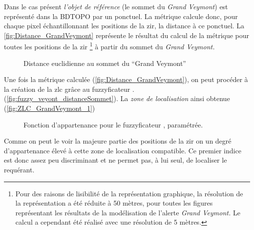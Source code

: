 Dans le cas présent \emph{l'objet de référence} (le sommet du
\emph{Grand Veymont}) est représenté dans la BDTOPO par un
ponctuel. La métrique  calcule donc, pour chaque
pixel échantillonnant les positions de la \ac{zir}, la distance à ce
ponctuel. La \autoref{fig:Distance_GrandVeymont} représente le
résultat du calcul de la métrique  pour toutes
les positions de la \ac{zir} \footnote{Pour des raisons de lisibilité
  de la représentation graphique, la résolution de la représentation a
  été réduite à 50 mètres, pour toutes les figures représentant les
  résultats de la modélisation de l'alerte \emph{Grand Veymont.} Le
  calcul a cependant été réalisé avec une résolution de 5 mètres.} à
partir du sommet du \emph{Grand Veymont.}

\begin{figure}
  \centering
  
  \caption{Distance euclidienne au sommet du \enquote{Grand Veymont}}
  \label{fig:Distance_GrandVeymont}
\end{figure}

Une fois la métrique calculée (\autoref{fig:Distance_GrandVeymont}),
on peut procéder à la création de la \ac{zlc} grâce au fuzzyficateur
. 
(\autoref{fig:fuzzy_veyont_distanceSommet}). La \emph{zone de
  localisation} ainsi obtenue (\autoref{fig:ZLC_GrandVeymont_1})
%

\begin{figure}
  \centering
  
  \caption{Fonction d'appartenance pour le fuzzyficateur
    \protect{}, paramétrée.}
  \label{fig:fuzzy_veyont_distanceSommet}
\end{figure}

Comme on peut le voir la majeure partie des positions de la \ac{zir}
on un degré d'appartenance élevé à cette zone de localisation
compatible. Ce premier indice est donc assez peu discriminant et ne
permet pas, à lui seul, de localiser le requérant.

